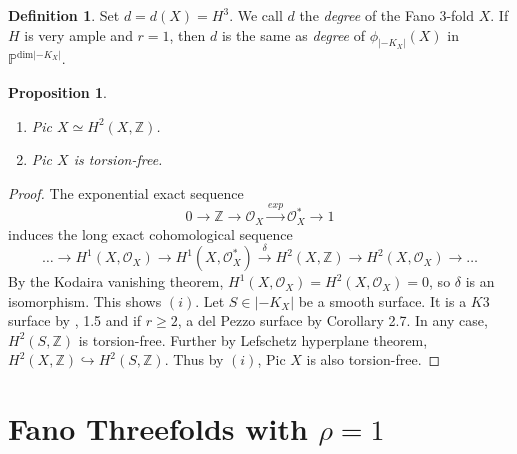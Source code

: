 \documentclass[11pt]{amsart}
\theoremstyle{plain}
\newtheorem{proposition}[theorem]{Proposition}
\theoremstyle{definition}
\newtheorem{definition}[theorem]{Definition}
\theoremstyle{expl}
\begin{document}
\begin{definition}
    Set $d = d(X) =H^3$. We call $d$ the \textit{degree} of the Fano $3$-fold $X$. If $H$ is very ample and $r=1$, then $d$ is the same as \textit{degree} of $\phi_{|-K_X|}(X)$ in $\mathbb{P}^{\text{dim}|-K_X|}$.
\end{definition}
\begin{proposition}
\label{pic}
	\begin{enumerate}
		\item[(i)] Pic $X \simeq H^2(X,\mathbb{Z})$.
		\item[(ii)] Pic $X$ is torsion-free. 
	\end{enumerate}
\end{proposition}
\begin{proof}
	The exponential exact sequence 
	\[
	0 \rightarrow \mathbb{Z} \rightarrow \mathcal{O}_X  \xrightarrow{exp} \mathcal{O}_X^* \rightarrow 1
	\]
	 induces the long exact cohomological sequence 
	 \[
	 \dots \rightarrow H^1(X,\mathcal{O}_X) \rightarrow H^1(X,\mathcal{O}_X^*) \xrightarrow{\delta} H^2(X,\mathbb{Z}) \rightarrow H^2(X,\mathcal{O}_X)\rightarrow \dots 
	 \]
	 By the Kodaira vanishing theorem, $H^1(X,\mathcal{O}_X) = H^2(X,\mathcal{O}_X) =0$, so $\delta$ is an isomorphism. This shows $(i)$. Let $S \in |-K_X|$ be a smooth surface. It is a $K3$ surface by \cite{Isk77}, 1.5 and if $r \geq 2$, a del Pezzo surface by Corollary 2.7. In any case, $H^2(S,\mathbb{Z})$ is torsion-free. Further by Lefschetz hyperplane theorem, $H^2(X,\mathbb{Z}) \hookrightarrow H^2(S,\mathbb{Z})$. Thus by $(i)$, Pic $X$ is also torsion-free.
\end{proof}

	  
\section{Fano Threefolds with $\rho =1$}
\end{document}
